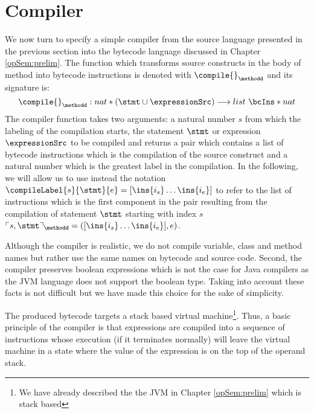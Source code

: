 

\newtheorem{Compiler}{Definition}

\section{Compiler} \label{compile}

 We now turn to specify a simple compiler from the source language presented in the previous section
 into the bytecode language discussed in  Chapter \ref{opSem:prelim}. The function which transforms
 source constructs in the body of method \methodd{} into bytecode instructions is denoted with
 $\compile{}_{\methodd}$ and its signature is:  
 $$ \compile{ }_{\methodd} : nat * (\stmt \cup \expressionSrc ) \longrightarrow  list \ \bcIns * nat  $$
 The compiler function takes two arguments: a natural number $s$ from which the labeling of the compilation starts,
 the statement $\stmt$ or expression $\expressionSrc$  to be compiled and
 returns a pair which contains a list of bytecode instructions which is the compilation of the source construct
 and  a natural number which is the greatest label in the compilation. In the following, we will allow us
 to use instead the notation 
 $ \compileLabel{s}{\stmt}{e} =[\ins{i_s} \ldots \ins{i_e} ] $
 to refer to the list of instructions  which is the first component in the pair resulting from the compilation of 
 statement $\stmt$  starting with index $s$ \ 
 $\ulcorner  s, \stmt  \urcorner_{\methodd} = ( [\ins{i_s} \ldots \ins{i_e}], e) $.

 Although the compiler is realistic, we do not compile variable, class and method names but rather use the same names on bytecode
 and source code. Second, the compiler preserves boolean expressions which is not the case for Java compilers as the JVM language does not support
 the boolean type. Taking into account these facts is not difficult but we have made this choice for the sake of simplicity.



 The produced bytecode targets a stack based virtual machine\footnote{We have already described the
 the JVM in Chapter \ref{opSem:prelim} which is stack based}. Thus, a basic principle of the compiler 
 is that  expressions are compiled into a sequence of instructions whose execution (if it terminates normally)  
 will leave the virtual machine in a state where the value of the expression is on the top of the operand stack.

